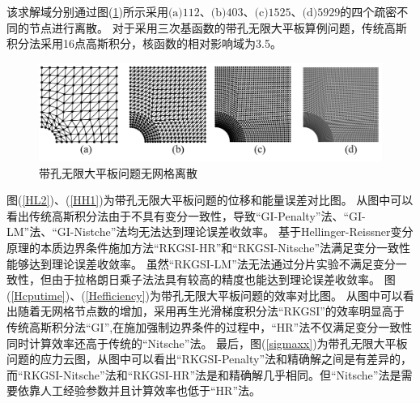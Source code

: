 该求解域分别通过图(\ref{hole.mesh})所示采用$\text{(a)}112$、$\text{(b)}403$、$\text{(c)}1525$、$\text{(d)}5929$的四个疏密不同的节点进行离散。
对于采用三次基函数的带孔无限大平板算例问题，传统高斯积分法采用16点高斯积分，核函数的相对影响域为3.5。\par
\begin{figure}[H]
\centering
 \includegraphics[scale=0.6]{figure/EHR/hole/hole.mesh.png}
   \caption{带孔无限大平板问题无网格离散}\label{hole.mesh}
\end{figure}
图(\ref{HL2})、(\ref{HH1})为带孔无限大平板问题的位移和能量误差对比图。
从图中可以看出传统高斯积分法由于不具有变分一致性，导致“GI-Penalty”法、“GI-LM”法、“GI-Nistche”法均无法达到理论误差收敛率。
基于Hellinger-Reissner变分原理的本质边界条件施加方法“RKGSI-HR”和“RKGSI-Nitsche”法满足变分一致性能够达到理论误差收敛率。
虽然“RKGSI-LM”法无法通过分片实验不满足变分一致性，但由于拉格朗日乘子法法具有较高的精度也能达到理论误差收敛率。
图(\ref{Hcputime})、(\ref{Hefficiency})为带孔无限大平板问题的效率对比图。
从图中可以看出随着无网格节点数的增加，采用再生光滑梯度积分法“RKGSI”的效率明显高于传统高斯积分法“GI”,在施加强制边界条件的过程中，“HR”法不仅满足变分一致性同时计算效率还高于传统的“Nitsche”法。
最后，图(\ref{sigmaxx})为带孔无限大平板问题的应力云图，从图中可以看出“RKGSI-Penalty”法和精确解之间是有差异的，
而“RKGSI-Nitsche”法和“RKGSI-HR”法是和精确解几乎相同。但“Nitsche”法是需要依靠人工经验参数并且计算效率也低于“HR”法。
